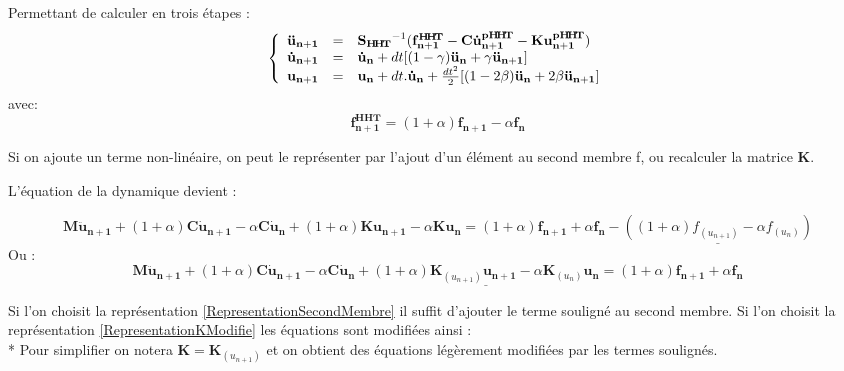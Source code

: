 \documentclass[12pt,a4paper]{report}
\begin{document}
\noindent
Permettant de calculer en trois étapes :
\begin{equation}
\label{Prediction}
	\left\{
		\begin{array}{r c l}
			\mathbf{\ddot{u}_{n+1}} 
			&=& \mathbf{ {S_{H\!H\!T}} }^{-1} (  \mathbf{f_{n+1}^{H\!H\!T} }
				- \mathbf{C} \mathbf{\dot{u}_{n+1}^{pH\!H\!T}} - \mathbf{K} \mathbf{u_{n+1}^{pH\!H\!T} } )
			\\ \mathbf{\dot{u}_{n+1}} &=& \mathbf{\dot{u}_n} 
				+ dt[(1-\gamma)\mathbf{\ddot{u}_n} + \gamma \mathbf{\ddot{u}_{n+1}}]
			\\ \mathbf{u_{n+1}} &=& \mathbf{u_n} + dt.\mathbf{\dot{u}_n}
				+ \frac{dt^2}{2}[(1-2\beta)\mathbf{\ddot{u}_n} + 2\beta\mathbf{\ddot{u}_{n+1}}]
		\end{array}
	\right.
\end{equation}
avec:
\begin{equation}
		\mathbf{f_{n+1}^{H\!H\!T}} = (1+\alpha)\mathbf{f_{n+1}}  - \alpha \mathbf{f_n}
\end{equation}

Si on ajoute un terme non-linéaire, on peut le représenter par l'ajout d'un élément au second membre f, ou recalculer la matrice $\mathbf{K}$.

\noindent
L'équation de la dynamique devient :

\begingroup\footnotesize
\begin{equation}
\label{RepresentationSecondMembre}
	\mathbf{M}{\mathbf{\ddot{u}_{n+1}}} 
	+ (1+\alpha)\mathbf{C}{\mathbf{\dot{u}_{n+1}}}
	- \alpha \mathbf{C}{\mathbf{\dot{u}_n}}
	+ (1+\alpha) \mathbf{K} \mathbf{u_{n+1}}
	- \alpha \mathbf{K} \mathbf{u_n}
	= (1+\alpha)\mathbf{f_{n+1}}  + \alpha \mathbf{f_n}
	- \underline{ ((1+\alpha) f_{(u_{n+1})} - \alpha f_{(u_n)}) }
\end{equation}
\endgroup
Ou :
\begin{equation}
\label{RepresentationKModifie}
	\mathbf{M}{\mathbf{\ddot{u}_{n+1}}} 
	+ (1+\alpha)\mathbf{C}{\mathbf{\dot{u}_{n+1}}}
	- \alpha \mathbf{C}{\mathbf{\dot{u}_n}}
	+ \underline{
	(1+\alpha) \mathbf{K}_{(u_{n+1})} \mathbf{u_{n+1}}
	- \alpha \mathbf{K}_{(u_{n})} \mathbf{u_n}  }
	= (1+\alpha)\mathbf{f_{n+1}}  + \alpha \mathbf{f_n}
\end{equation}


Si l'on choisit la représentation \ref{RepresentationSecondMembre} il suffit d'ajouter le terme souligné au second membre. Si l'on choisit la représentation \ref{RepresentationKModifie} les équations sont modifiées ainsi : 
\\ * Pour simplifier on notera $\mathbf{K} = \mathbf{K}_{(u_{n+1})}$ et on obtient des équations légèrement modifiées par les termes soulignés.
\end{document}
